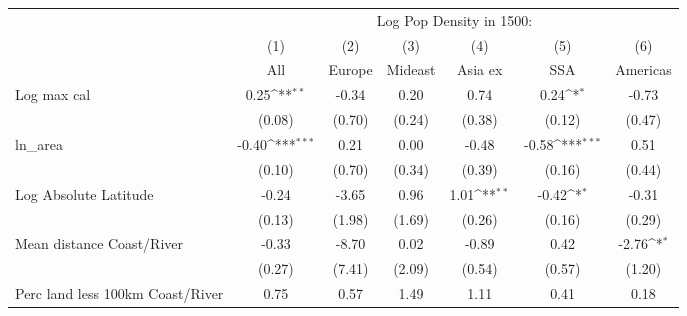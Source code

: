 {
\def\sym#1{\ifmmode^{#1}\else\(^{#1}\)\fi}
\begin{tabular}{l*{6}{c}}
\toprule
                    &\multicolumn{6}{c}{Log Pop Density in 1500:}                                                                                       \\
                    &\multicolumn{1}{c}{(1)}         &\multicolumn{1}{c}{(2)}         &\multicolumn{1}{c}{(3)}         &\multicolumn{1}{c}{(4)}         &\multicolumn{1}{c}{(5)}         &\multicolumn{1}{c}{(6)}         \\
                    &         All         &      Europe         &     Mideast         &     Asia ex         &         SSA         &    Americas         \\
\midrule
Log max cal         &        0.25\sym{**} &       -0.34         &        0.20         &        0.74         &        0.24\sym{*}  &       -0.73         \\
                    &      (0.08)         &      (0.70)         &      (0.24)         &      (0.38)         &      (0.12)         &      (0.47)         \\
\addlinespace
ln\_area             &       -0.40\sym{***}&        0.21         &        0.00         &       -0.48         &       -0.58\sym{***}&        0.51         \\
                    &      (0.10)         &      (0.70)         &      (0.34)         &      (0.39)         &      (0.16)         &      (0.44)         \\
\addlinespace
Log Absolute Latitude&       -0.24         &       -3.65         &        0.96         &        1.01\sym{**} &       -0.42\sym{*}  &       -0.31         \\
                    &      (0.13)         &      (1.98)         &      (1.69)         &      (0.26)         &      (0.16)         &      (0.29)         \\
\addlinespace
Mean distance Coast/River&       -0.33         &       -8.70         &        0.02         &       -0.89         &        0.42         &       -2.76\sym{*}  \\
                    &      (0.27)         &      (7.41)         &      (2.09)         &      (0.54)         &      (0.57)         &      (1.20)         \\
\addlinespace
Perc land less 100km Coast/River&        0.75         &        0.57         &        1.49         &        1.11         &        0.41         &        0.18         \\

\end{tabular}}
